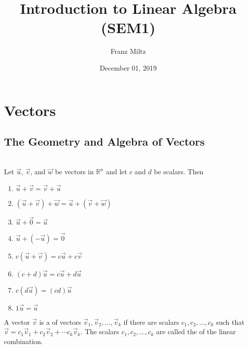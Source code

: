 \documentclass{article}
\begin{document}
\title{Introduction to Linear Algebra (SEM1)}
\author{Franz Miltz}
\date{December 01, 2019}
\maketitle
\tableofcontents
\pagebreak
\section{Vectors}
\subsection{The Geometry and Algebra of Vectors}
\begin{theorem}
    \\
    Let $\vec u$, $\vec v$, and $\vec w$ be vectors in $\mathbb{R}^n$ and let $c$ and $d$ be scalars. Then
    \begin{enumerate}
        \item $\vec u + \vec v = \vec v + \vec u$
        \item $(\vec u + \vec v) + \vec w = \vec u + (\vec v + \vec w)$
        \item $\vec u + \vec 0 = \vec u$
        \item $\vec u + (- \vec u) = \vec 0$
        \item $c(\vec u + \vec v) = c\vec u + c\vec v$
        \item $(c+d)\vec u = c\vec u + d\vec u$
        \item $c(d\vec u) = (cd)\vec u$
        \item $1\vec u = \vec u$
    \end{enumerate}
\end{theorem}
\begin{definition}
    A vector $\vec v$ is a  of vectors $\vec v_1, \vec v_2, ...,\vec v_k$ if there are scalars $c_1, c_2, ..., c_k$ such that $\vec v = c_1 \vec v_1 + c_2 \vec v_2 + \cdots c_k\vec v_k$. The scalars $c_1, c_2, ..., c_k$ are called the  of the linear combination.
\end{definition}
\end{document}
